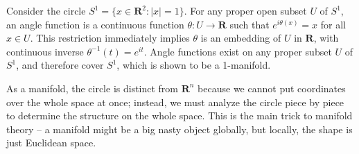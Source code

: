 \begin{example}
    Consider the circle $S^1 = \{ x \in \mathbf{R}^2 : |x| = 1 \}$. For any proper open subset $U$ of $S^1$, an angle function is a continuous function $\theta:U \to \mathbf{R}$ such that $e^{i\theta(x)} = x$ for all $x \in U$. This restriction immediately implies $\theta$ is an embedding of $U$ in $\mathbf{R}$, with continuous inverse $\theta^{-1}(t) = e^{it}$. Angle functions exist on any proper subset $U$ of $S^1$, and therefore cover $S^1$, which is shown to be a 1-manifold.
\end{example}



As a manifold, the circle is distinct from $\mathbf{R}^n$ because we cannot put coordinates over the whole space at once; instead, we must analyze the circle piece by piece to determine the structure on the whole space. This is the main trick to manifold theory -- a manifold might be a big nasty object globally, but locally, the shape is just Euclidean space.

